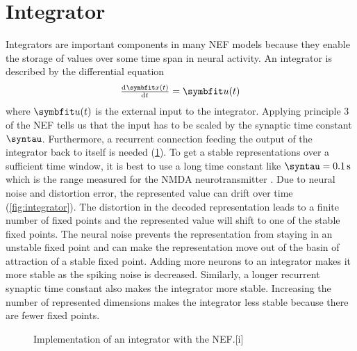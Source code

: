 \section{Integrator}
Integrators are important components in many NEF models because they enable the storage of values over some time span in neural activity.
An integrator is described by the differential equation
\begin{equation}
    \od{\vc x(t)}{t} = \vc u(t)
\end{equation}
where $\vc u(t)$ is the external input to the integrator.
Applying principle 3 of the NEF tells us that the input has to be scaled by the synaptic time constant $\syntau$.
Furthermore, a recurrent connection feeding the output of the integrator back to itself is needed (\cref{fig:integrator-net}).
To get a stable representations over a sufficient time window, it is best to use a long time constant like $\syntau = \SI{0.1}{\second}$ which is the range measured for the NMDA neurotransmitter \parencite{sah1990-1,moreno-bote2005}.
Due to neural noise and distortion error, the represented value can drift over time (\cref{fig:integrator}).
The distortion in the decoded representation leads to a finite number of fixed points and the represented value will shift to one of the stable fixed points.
The neural noise prevents the representation from staying in an unstable fixed point and can make the representation move out of the basin of attraction of a stable fixed point.
Adding more neurons to an integrator makes it more stable as the spiking noise is decreased.
Similarly, a longer recurrent synaptic time constant also makes the integrator more stable.
Increasing the number of represented dimensions makes the integrator less stable because there are fewer fixed points.
\begin{figure}
    \begin{captionbeside}{Implementation of an integrator with the NEF\label{fig:integrator-net}.}[i]
    \end{captionbeside}
\end{figure}
